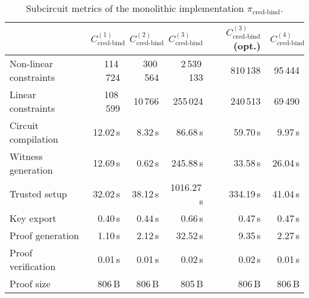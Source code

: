 \begin{table}[t]
	\centering
	\begin{tabular}{lrrrrr}
		\toprule
		& \textbf{$C_{\text{cred-bind}}^{(1)}$} 
		& \textbf{$C_{\text{cred-bind}}^{(2)}$} 
		& \textbf{$C_{\text{cred-bind}}^{(3)}$} 
		& \textbf{$C_{\text{cred-bind}}^{(3)}$ (opt.)} 
		& \textbf{$C_{\text{cred-bind}}^{(4)}$} \\
		\midrule
		Non-linear constraints & 114\,724 & 300\,564 & 2\,539\,133 & 810\,138 & 95\,444 \\
		Linear constraints     & 108\,599 & 10\,766  & 255\,024   & 240\,513 & 69\,490 \\
		\midrule
		Circuit compilation    & 12.02\,s & 8.32\,s  & 86.68\,s   & 59.70\,s & 9.97\,s \\
		Witness generation     & 12.69\,s & 0.62\,s  & 245.88\,s  & 33.58\,s & 26.04\,s \\
		Trusted setup          & 32.02\,s & 38.12\,s & 1016.27\,s & 334.19\,s & 41.04\,s \\
		Key export             & 0.40\,s  & 0.44\,s  & 0.66\,s    & 0.47\,s  & 0.47\,s \\
		Proof generation       & 1.10\,s  & 2.12\,s  & 32.52\,s   & 9.35\,s  & 2.27\,s \\
		Proof verification     & 0.01\,s  & 0.01\,s  & 0.02\,s    & 0.02\,s  & 0.01\,s \\
		Proof size             & 806\,B   & 806\,B   & 805\,B     & 806\,B   & 806\,B \\
		\bottomrule
	\end{tabular}
	\caption{Subcircuit metrics of the monolithic implementation $\pi_{\text{cred-bind}}$.}
	\label{tab:monolithic-subcircuits}
\end{table}

